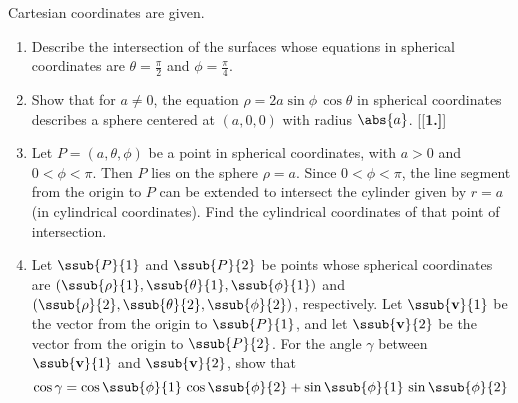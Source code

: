Cartesian coordinates are given.
\begin{enumerate}[\bfseries 1.]
\par\noindent For Exercises 5-7, write the given equation in (a) cylindrical and (b) spherical coordinates.
[{[\bfseries 1.]}]
\vspace{1mm}
[{[\bfseries 1.]}]
 \item Describe the intersection of the surfaces whose equations in spherical coordinates are $\theta = \frac{\pi}{2}$
  and $\phi = \frac{\pi}{4}$.
 \item Show that for $a \ne 0$, the equation $\rho = 2a \sin \phi \, \cos \theta$ in spherical coordinates describes a
  sphere centered at $(a,0,0)$ with radius $\abs{a}$.
[{[\bfseries 1.]}]
 \item Let $P = (a,\theta,\phi)$ be a point in spherical coordinates, with $a > 0$ and $0 < \phi < \pi$. Then $P$ lies
  on the sphere $\rho = a$. Since $0 < \phi < \pi$, the line segment from the origin to $P$
  can be extended to intersect the cylinder given by $r = a$ (in cylindrical coordinates). Find the cylindrical
  coordinates of that point of intersection.
 \item Let $\ssub{P}{1}$ and $\ssub{P}{2}$ be points whose spherical coordinates are
  $( \ssub{\rho}{1},\ssub{\theta}{1},\ssub{\phi}{1} )$ and $( \ssub{\rho}{2},\ssub{\theta}{2},\ssub{\phi}{2} )$,
  respectively. Let $\ssub{\textbf{v}}{1}$ be the vector from the origin to $\ssub{P}{1}$, and let
  $\ssub{\textbf{v}}{2}$ be the vector from the origin to $\ssub{P}{2}$. For the angle $\gamma$ between
  $\ssub{\textbf{v}}{1}$ and $\ssub{\textbf{v}}{2}$, show that
  \begin{displaymath}
   \cos \gamma = \cos \ssub{\phi}{1} \, \cos \ssub{\phi}{2} + \sin \ssub{\phi}{1} \, \sin \ssub{\phi}{2} \,

\end{displaymath}
\end{enumerate}

